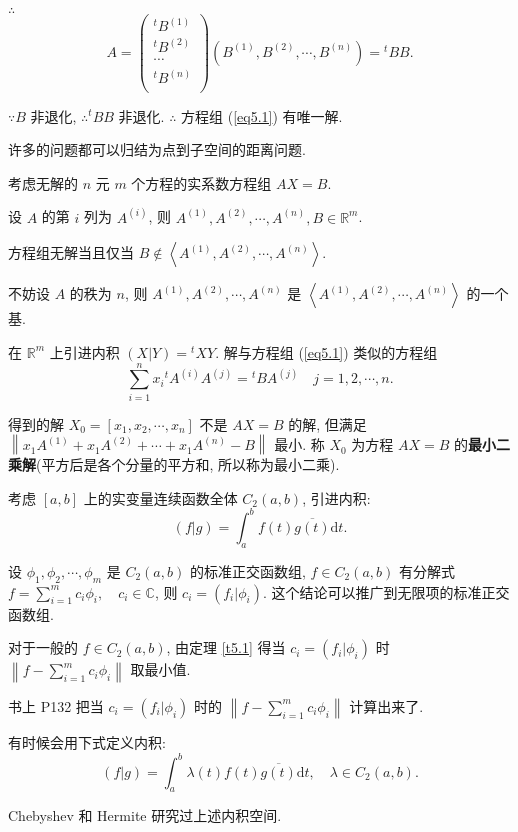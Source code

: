 \documentclass{ctexart}
\begin{document}
$\therefore$
\[A=\begin{pmatrix}
    {}^tB^{(1)} \\
    {}^tB^{(2)} \\
    \cdots \\
    {}^tB^{(n)} \\
\end{pmatrix}(B^{(1)},B^{(2)},\cdots,B^{(n)})={}^tBB.\]

$\because B$ 非退化, $\therefore{}^tBB$ 非退化. $\therefore$ 方程组 (\ref{eq5.1}) 有唯一解.

许多的问题都可以归结为点到子空间的距离问题.
\begin{example}\label{exa5.1}
    考虑无解的 $n$ 元 $m$ 个方程的实系数方程组 $AX=B$.
    
    设 $A$ 的第 $i$ 列为 $A^{(i)}$, 则 $A^{(1)},A^{(2)},\cdots,A^{(n)},B\in\mathbb{R}^m$.
    
    方程组无解当且仅当 $B\notin\left<A^{(1)},A^{(2)},\cdots,A^{(n)}\right>$.
    
    不妨设 $A$ 的秩为 $n$, 则 $A^{(1)},A^{(2)},\cdots,A^{(n)}$ 是 $\left<A^{(1)},A^{(2)},\cdots,A^{(n)}\right>$ 的一个基.

    在 $\mathbb{R}^m$ 上引进内积 $(X|Y)={}^tXY$. 解与方程组 (\ref{eq5.1}) 类似的方程组
    \[\sum\limits_{i=1}^nx_i{}^tA^{(i)}A^{(j)}={}^tBA^{(j)}\quad j=1,2,\cdots,n.\]
    
    得到的解 $X_0=[x_1,x_2,\cdots,x_n]$ 不是 $AX=B$ 的解, 但满足 $\left\|x_1A^{(1)}+x_1A^{(2)}+\cdots+x_1A^{(n)}-B\right\|$ 最小. 称 $X_0$ 为方程 $AX=B$ 的\textbf{最小二乘解}(平方后是各个分量的平方和, 所以称为最小二乘).
\end{example}
\begin{example}
    考虑 $[a,b]$ 上的实变量连续函数全体 $C_2(a,b)$, 引进内积:
    \[(f|g)=\int_a^bf(t)\overline{g(t)}\mathrm{d}t.\]
    
    设 $\phi_1,\phi_2,\cdots,\phi_m$ 是 $C_2(a,b)$ 的标准正交函数组, $f\in C_2(a,b)$ 有分解式 $f=\sum\limits_{i=1}^mc_i\phi_i,\quad c_i\in\mathbb{C}$, 则 $c_i=(f_i|\phi_i)$. 这个结论可以推广到无限项的标准正交函数组.

    对于一般的 $f\in C_2(a,b)$, 由定理 \ref{t5.1} 得当 $c_i=(f_i|\phi_i)$ 时 $\left\|f-\sum\limits_{i=1}^mc_i\phi_i\right\|$ 取最小值.

    书上 P132 把当 $c_i=(f_i|\phi_i)$ 时的 $\left\|f-\sum\limits_{i=1}^mc_i\phi_i\right\|$ 计算出来了.

    有时候会用下式定义内积:
    \[(f|g)=\int_a^b\lambda(t)f(t)\overline{g(t)}\mathrm{d}t,\quad\lambda\in C_2(a,b).\]

    Chebyshev 和 Hermite 研究过上述内积空间.
\end{example}
\end{document}
